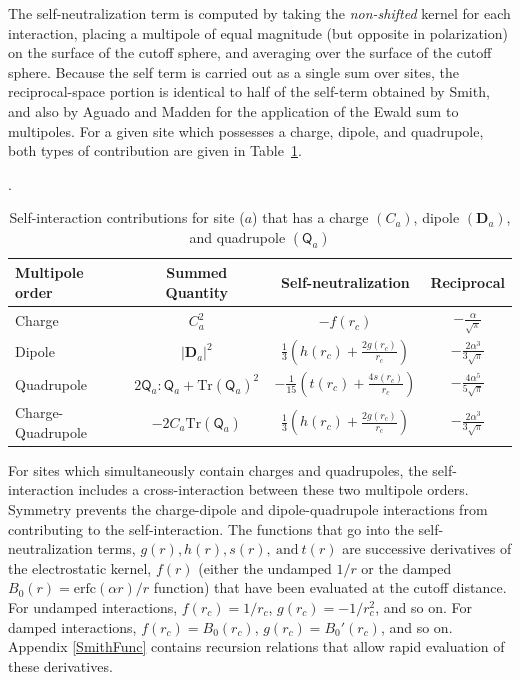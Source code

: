 The self-neutralization term is computed by taking the {\it
  non-shifted} kernel for each interaction, placing a multipole of
equal magnitude (but opposite in polarization) on the surface of the
cutoff sphere, and averaging over the surface of the cutoff sphere.
Because the self term is carried out as a single sum over sites, the
reciprocal-space portion is identical to half of the self-term
obtained by Smith, and also by Aguado and Madden for the application
of the Ewald sum to multipoles.\cite{Smith82,Smith98,Aguado03} For a
given site which possesses a charge, dipole, and quadrupole, both types
of contribution are given in Table~\ref{tab:tableSelf}.

\begin{table}
\begin{center}
  \caption{\label{tab:tableSelf} Self-interaction contributions for 
    site ($a$) that has a charge $(C_a)$, dipole
    $(\mathbf{D}_a)$, and quadrupole $(\mathsf{Q}_a)$}.
\begin{ruledtabular}
\begin{tabular}{|l|c|c|c|} \hline
Multipole order & Summed Quantity & Self-neutralization  & Reciprocal \\ \hline
Charge & $C_a^2$ & $-f(r_c)$ & $-\frac{\alpha}{\sqrt{\pi}}$ \\
Dipole & $|\mathbf{D}_a|^2$ & $\frac{1}{3} \left( h(r_c) +
  \frac{2 g(r_c)}{r_c} \right)$ & $-\frac{2 \alpha^3}{3 \sqrt{\pi}}$\\
Quadrupole & $2 \mathsf{Q}_a:\mathsf{Q}_a + \text{Tr}(\mathsf{Q}_a)^2$ &
$- \frac{1}{15} \left( t(r_c)+ \frac{4 s(r_c)}{r_c} \right)$ &
$-\frac{4 \alpha^5}{5 \sqrt{\pi}}$ \\
Charge-Quadrupole & $-2 C_a \text{Tr}(\mathsf{Q}_a)$ & $\frac{1}{3} \left(
  h(r_c) + \frac{2 g(r_c)}{r_c} \right)$& $-\frac{2 \alpha^3}{3 \sqrt{\pi}}$ \\ \hline
\end{tabular}
\end{ruledtabular}
\end{center}
\end{table}

For sites which simultaneously contain charges and quadrupoles, the
self-interaction includes a cross-interaction between these two
multipole orders.  Symmetry prevents the charge-dipole and
dipole-quadrupole interactions from contributing to the
self-interaction.  The functions that go into the self-neutralization
terms, $g(r), h(r), s(r), \mathrm{~and~} t(r)$ are successive
derivatives of the electrostatic kernel, $f(r)$ (either the undamped
$1/r$ or the damped $B_0(r)=\mathrm{erfc}(\alpha r)/r$ function) that
have been evaluated at the cutoff distance.  For undamped
interactions, $f(r_c) = 1/r_c$, $g(r_c) = -1/r_c^{2}$, and so on.  For
damped interactions, $f(r_c) = B_0(r_c)$, $g(r_c) = B_0'(r_c)$, and so
on.  Appendix \ref{SmithFunc} contains recursion relations that allow
rapid evaluation of these derivatives.

